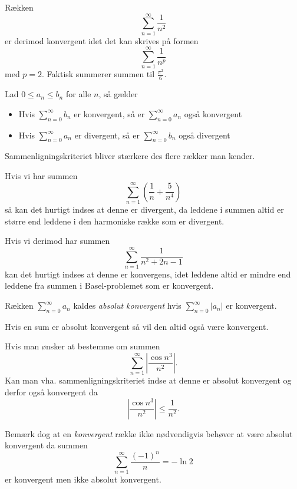\begin{eks}  \label{afs:baspro}
  Rækken
  \[ 
  \sum_{n = 1}^{\infty} \frac{1}{n^2}
  \]
  er derimod konvergent idet det kan skrives på formen
    \[ 
  \sum_{n =1}^{\infty} \frac{1}{n^{p}}
  \]
  med $p = 2$. Faktisk summerer summen til $\frac{\pi^2}{6}$.
\end{eks}

\begin{sæt} [Sammenligningskriteriet]
  Lad $0 \leq a_n \leq b_n$ for alle $n$, så gælder
  \begin{itemize}
    \item Hvis $\sum_{n = 0}^{\infty} b_n$ er konvergent, så er $\sum_{n = 0}^{\infty} a_n$ også konvergent
    \item Hvis $\sum_{n = 0}^{\infty} a_n$ er divergent, så er $\sum_{n = 0}^{\infty} b_n$ også divergent
  \end{itemize}
  Sammenligningskriteriet bliver stærkere des flere rækker man kender.
\end{sæt}

\begin{eks} 
  Hvis vi har summen
  \[ 
  \sum_{n = 1}^{\infty} \left( \frac{1}{n} + \frac{5}{n^{4}} \right)
  \]
  så kan det hurtigt indses at denne er divergent, da leddene i summen altid er større end leddene i den harmoniske række som er divergent.

  Hvis vi derimod har summen
  \[ 
  \sum_{n = 1}^{\infty} \frac{1}{n^2 + 2n - 1}
  \]
  kan det hurtigt indses at denne er konvergens, idet leddene altid er mindre end leddene fra summen i Basel-problemet som er konvergent.
\end{eks}

\begin{definition} 
  Rækken $\sum_{n = 0}^{\infty} a_n$ kaldes \textit{absolut konvergent} hvis $\sum_{n = 0}^{\infty} |a_n|$ er konvergent.
\end{definition}

\begin{sæt} 
  Hvis en sum er absolut konvergent så vil den altid også være konvergent.
\end{sæt}

\begin{eks}
  Hvis man ønsker at bestemme om summen
  \[ 
  \sum_{n = 1}^{\infty} \left| \frac{\cos n^3}{n^2} \right|
  .\]
  Kan man vha. sammenligningskriteriet indse at denne er absolut konvergent og derfor også konvergent da
  \[ 
  \left| \frac{\cos n^3}{n^2} \right| \leq \frac{1}{n^2}
  .\]
\end{eks}
Bemærk dog at en \textit{konvergent} række ikke nødvendigvis behøver at være absolut konvergent da summen
\[ 
\sum_{n = 1}^{\infty} \frac{(-1)^{n}}{n} = -\ln 2
\]
er konvergent men ikke absolut konvergent. 

